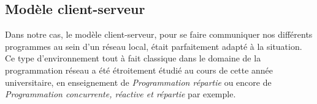 \subsection{Modèle client-serveur}

Dans notre cas, le modèle client-serveur, pour se faire communiquer nos différents programmes au sein d'un réseau local, était parfaitement adapté à la situation. Ce type d'environnement tout à fait classique dans le domaine de la programmation réseau a été étroitement étudié au cours de cette année universitaire, en enseignement de \textit{Programmation répartie} ou encore de \textit{Programmation concurrente, réactive et répartie} par exemple.